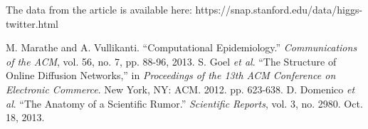 \documentclass[12pt, oneside, openany]{article} %
\begin{document}
The data from the article is available here:
https://snap.stanford.edu/data/higgs-twitter.html

\newpage
\begin{thebibliography}{1}
 M. Marathe and A. Vullikanti. ``Computational Epidemiology.'' \emph{Communications of the ACM}, vol. 56, no. 7, pp. 88-96, 2013.
 S. Goel \emph{et al}. ``The Structure of Online Diffusion Networks,'' in \emph{Proceedings of the 13th ACM Conference on Electronic Commerce}. New York, NY: ACM. 2012. pp. 623-638.
 D. Domenico \emph{et al}. ``The Anatomy of a Scientific Rumor.'' \emph{Scientific Reports}, vol. 3, no. 2980. Oct. 18, 2013.
  \end{thebibliography}
\end{document}
